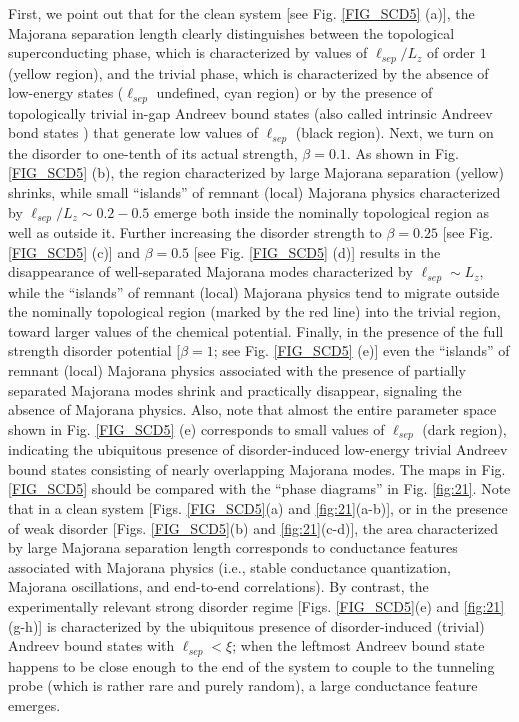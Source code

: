 \documentclass[aps,prmaterials,twocolumn,superscriptaddress,longbibliography]{revtex4-2}
\begin{document}
First, we point out that for the clean system [see Fig. \ref{FIG_SCD5} (a)], the Majorana separation length clearly distinguishes between the topological superconducting phase, which is characterized by values of $\ell_{sep}/L_z$ of order $1$ (yellow region), and the trivial phase, which is characterized by the absence of low-energy states ($\ell_{sep}$ undefined, cyan region) or by the presence of topologically trivial in-gap Andreev bound states (also called intrinsic Andreev bond states \cite{huang2018metamorphosis}) that generate low values of $\ell_{sep}$ (black region). 
Next, we turn on the disorder to one-tenth of its actual strength, $\beta = 0.1$. As shown in Fig. \ref{FIG_SCD5} (b), the region characterized by large Majorana separation (yellow) shrinks, while small ``islands'' of remnant (local) Majorana physics characterized by $\ell_{sep}/L_z \sim 0.2-0.5$ emerge both inside the nominally topological region as well as outside it. Further increasing the disorder strength to $\beta = 0.25$ [see Fig. \ref{FIG_SCD5} (c)] and  $\beta = 0.5$ [see Fig. \ref{FIG_SCD5} (d)] results in the disappearance of well-separated Majorana modes characterized by $\ell_{sep}\sim L_z$, while the ``islands'' of remnant (local) Majorana physics tend to migrate outside the nominally topological region (marked by the red line) into the trivial region, toward larger values of the chemical potential. Finally, in the presence of the full strength disorder potential [$\beta=1$; see Fig. \ref{FIG_SCD5} (e)]  even the ``islands'' of remnant (local) Majorana physics associated with the presence of partially separated Majorana modes shrink and practically disappear, signaling the absence of Majorana physics. Also, note that almost the entire parameter space shown in Fig. \ref{FIG_SCD5} (e) corresponds to small values of $\ell_{sep}$ (dark region), indicating the ubiquitous presence of disorder-induced low-energy trivial Andreev bound states consisting of nearly overlapping Majorana modes.   The maps in Fig. \ref{FIG_SCD5} should be compared with the ``phase diagrams'' in Fig. \ref{fig:21}. Note that in a clean system [Figs. \ref{FIG_SCD5}(a) and \ref{fig:21}(a-b)],  or in the presence of weak disorder [Figs. \ref{FIG_SCD5}(b) and \ref{fig:21}(c-d)], the area characterized by large Majorana separation length corresponds to conductance features associated with Majorana physics (i.e., stable conductance quantization, Majorana oscillations, and end-to-end correlations). By contrast, the experimentally relevant strong disorder regime [Figs. \ref{FIG_SCD5}(e) and \ref{fig:21}(g-h)] is characterized by the ubiquitous presence of disorder-induced (trivial) Andreev bound states with $\ell_{sep}<\xi$; when the leftmost Andreev bound state happens to be close enough to the end of the system to couple to the tunneling probe (which is rather rare and purely random), a large conductance feature emerges. 
\end{document}
